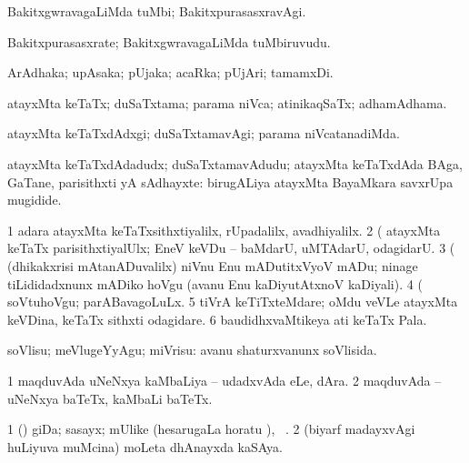 \bentry
{} 
\gl{\kirxvi}
\expl{}
\bmng
BakitxgwravagaLiMda tuMbi; BakitxpurasasxravAgi. 
\emng
\eentry

\bentry
{} 
\gl{\nA}
\expl{}
\bmng
Bakitxpurasasxrate; BakitxgwravagaLiMda tuMbiruvudu. 
\emng
\eentry

\bentry
{} 
\gl{\nA}
\expl{}
\bmng
ArAdhaka; upAsaka; pUjaka; acaRka; pUjAri; tamamxDi. 
\emng
\eentry

\bentry 
{} 
\gl{\gu}
\expl{}
\bmng
atayxMta keTaTx; duSaTxtama; parama niVca; atinikaqSaTx; adhamAdhama. 
\emng
\eentry

\bentry 
{} 
\gl{\kirxvi}
\expl{}
\bmng
atayxMta keTaTxdAdxgi; duSaTxtamavAgi; parama niVcatanadiMda. 
\emng
\eentry

\bentry 
{} 
\gl{\nA}
\expl{}
\bmng
atayxMta keTaTxdAdadudx; duSaTxtamavAdudu; atayxMta keTaTxdAda BAga, GaTane, parisithxti yA sAdhayxte:  birugALiya atayxMta BayaMkara savxrUpa mugidide. 
\emng

\noindent
\gl{\pagu}
\expl{}
\bmng
\bnum
\num{1}  adara atayxMta keTaTxsithxtiyalilx, rUpadalilx, avadhiyalilx. 
\num{2}  (  atayxMta keTaTx parisithxtiyalUlx; EneV keVDu -- baMdarU, uMTAdarU, odagidarU. 
\num{3}  (  (dhikakxrisi mAtanADuvalilx) niVnu Enu mADutitxVyoV mADu; ninage tiLididadxnunx mADiko hoVgu (avanu Enu kaDiyutAtxnoV kaDiyali). 
\num{4}  (  soVtuhoVgu; parABavagoLuLx. 
\num{5}  tiVrA keTiTxteMdare; oMdu veVLe atayxMta keVDina, keTaTx sithxti odagidare. 
\num{6}  baudidhxvaMtikeya ati keTaTx Pala. 
\enum
\emng
\eentry

\bentry 
{} 
\gl{\sakirx}
\expl{}
\bmng
soVlisu; meVlugeYyAgu; miVrisu:  avanu shaturxvanunx soVlisida. 
\emng
\eentry

\bentry
{} 
\gl{\nA}
\expl{}
\bmng
\bnum
\num{1} maqduvAda uNeNxya kaMbaLiya -- udadxvAda eLe, dAra. 
\num{2} maqduvAda -- uNeNxya baTeTx, kaMbaLi baTeTx. 
\enum
\emng
\eentry

\bentry
{} 
\gl{\nA}
\expl{}
\bmng
\bnum
\num{1} (\pArxparx) giDa; sasayx; mUlike (hesarugaLa horatu \viparx), \udA\ . 
\num{2} (biyarf madayxvAgi huLiyuva muMcina) moLeta dhAnayxda kaSAya. 
\enum
\emng
\eentry

